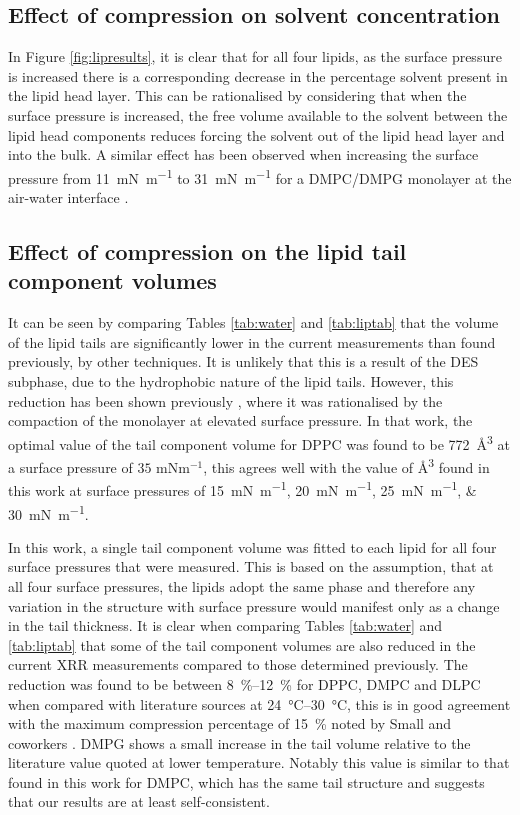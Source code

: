\documentclass[amsmath,amssymb,twocolumn,superscriptaddress]{revtex4-1}
\begin{document}
\subsection{Effect of compression on solvent concentration}
%
In Figure \ref{fig:lipresults}, it is clear that for all four lipids, as the surface pressure is increased there is a corresponding decrease in the percentage solvent present in the lipid head layer.
This can be rationalised by considering that when the surface pressure is increased, the free volume available to the solvent between the lipid head components reduces forcing the solvent out of the lipid head layer and into the bulk.
A similar effect has been observed when increasing the surface pressure from \SI{11}{\milli\newton\per\meter} to \SI{31}{\milli\newton\per\meter} for a DMPC/DMPG monolayer at the air-water interface \cite{Bayerl1990}.

\subsection{Effect of compression on the lipid tail component volumes}
%
It can be seen by comparing Tables \ref{tab:water} and \ref{tab:liptab} that the volume of the lipid tails are significantly lower in the current measurements than found previously, by other techniques.
It is unlikely that this is a result of the DES subphase, due to the hydrophobic nature of the lipid tails.
However, this reduction has been shown previously \cite{Campbell2018}, where it was rationalised by the compaction of the monolayer at elevated surface pressure.
In that work, the optimal value of the tail component volume for DPPC was found to be \SI{772}{\angstrom\cubed} at a surface pressure of $35$ mNm$^{-1}$, this agrees well with the value of \si{\angstrom\cubed} found in this work at surface pressures of \SIlist[list-units = single]{15;20;25;30}{\milli\newton\per\meter}.

In this work, a single tail component volume was fitted to each lipid for all four surface pressures that were measured.
This is based on the assumption, that at all four surface pressures, the lipids adopt the same phase and therefore any variation in the structure with surface pressure would manifest only as a change in the tail thickness.
It is clear when comparing Tables \ref{tab:water} and \ref{tab:liptab} that some of the tail component volumes are also reduced in the current XRR measurements compared to those determined previously.
The reduction was found to be between \SIrange{8}{12}{\percent} for DPPC, DMPC and DLPC when compared with literature sources at \SIrange{24}{30}{\celsius}, this is in good agreement with the maximum compression percentage of \SI{15}{\percent} noted by Small and coworkers \cite{Small1984}.
DMPG shows a small increase in the tail volume relative to the literature value quoted at lower temperature.
Notably this value is similar to that found in this work for DMPC, which has the same tail structure and suggests that our results are at least self-consistent.
\end{document}

